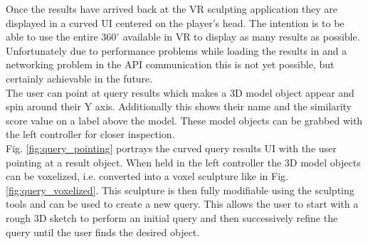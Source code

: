 Once the results have arrived back at the VR sculpting application they are displayed in a curved UI centered on the player's head. The intention is to be able to use the entire $360^{\circ}$ available in VR to display as many results as possible. Unfortunately due to performance problems while loading the results in and a networking problem in the API communication this is not yet possible, but certainly achievable in the future.\\
The user can point at query results which makes a 3D model object appear and spin around their Y axis. Additionally this shows their name and the similarity score value on a label above the model. These model objects can be grabbed with the left controller for closer inspection.\\
Fig. \ref{fig:query_pointing} portrays the curved query results UI with the user pointing at a result object. When held in the left controller the 3D model objects can be voxelized, i.e. converted into a voxel sculpture like in Fig. \ref{fig:query_voxelized}. This sculpture is then fully modifiable using the sculpting tools and can be used to create a new query. This allows the user to start with a rough 3D sketch to perform an initial query and then successively refine the query until the user finds the desired object.